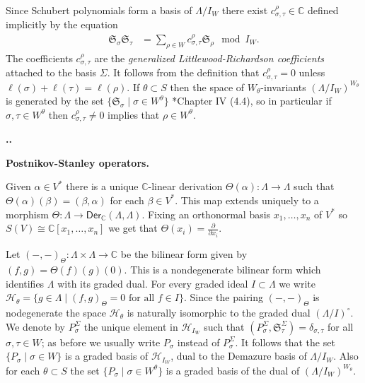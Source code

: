 \documentclass[11pt,fleqn]{amsart}
\renewcommand\thesection{\arabic{section}}
\newcounter{para}[section]
\renewcommand\thepara{\thesection.\arabic{para}}
\def\paragraph{%
 \noindent
 \refstepcounter{para}%
 \textbf{\thepara.}\hspace{1ex}%
}
\newcommand\about[1]{%
 {\bfseries#1.}%
}
\newcommand\CC{\mathbb C}
\renewcommand\to{\longrightarrow}
\renewcommand\SS{\mathfrak S}
\begin{document}
Since Schubert polynomials form a basis of $\Lambda / I_W$ there exist 
$c_{\sigma, \tau}^\rho \in \CC$ defined implicitly by the equation
\begin{align*}
\SS_\sigma \SS_\tau 
	&= \sum_{\rho \in W} c^\rho_{\sigma, \tau} \SS_\rho \mod I_W.
\end{align*}
The coefficients $c_{\sigma, \tau}^\rho$ are the \emph{generalized 
Littlewood-Richardson coefficients} attached to the basis $\Sigma$. It follows 
from the definition that $c^\rho_{\sigma, \tau} = 0$ unless $\ell(\sigma) + 
\ell(\tau) = \ell(\rho)$. If $\theta \subset S$ then the space of 
$W_\theta$-invariants $(\Lambda/I_W)^{W_\theta}$ is generated by the set 
$\{\SS_\sigma \mid \sigma \in W^\theta\}$ 
\cite{Hiller-coxeter-book}*{Chapter IV (4.4)}, so in particular if $\sigma, 
\tau \in W^\theta$ then $c^{\rho}_{\sigma, \tau} \neq 0$ implies that 
$\rho \in W^\theta$. 

\paragraph
\about{Postnikov-Stanley operators}
\label{ps-operators}
Given $\alpha \in V^*$ there is a unique $\CC$-linear derivation 
$\Theta(\alpha): \Lambda \to \Lambda$ such that $\Theta(\alpha)(\beta) = 
(\beta, \alpha)$ for each $\beta \in V^*$. This map extends uniquely to a 
morphism $\Theta: \Lambda \to \mathsf{Der}_\CC(\Lambda, \Lambda)$. Fixing an 
orthonormal basis $x_1, \ldots, x_n$ of $V^*$ so $S(V) \cong \CC[x_1, \ldots, 
x_n]$ we get that $\Theta(x_i) = \frac{\partial}{\partial x_i}$.

Let $(-,-)_\Theta: \Lambda \times \Lambda \to \CC$ be the bilinear form given 
by $(f,g) = \Theta(f)(g)(0)$. This is a nondegenerate bilinear form which 
identifies $\Lambda$ with its graded dual. For every graded ideal $I \subset 
\Lambda$ we write $\mathcal H_\theta = \{g \in \Lambda \mid (f,g)_\Theta = 0 
\mbox{ for all } f \in I\}$. Since the pairing $(-,-)_\Theta$ is nodegenerate 
the space $\mathcal H_\theta$ is naturally isomorphic to the graded dual 
$(\Lambda/I)^\circ$. We denote by $P_\sigma^\Sigma$ the unique element in 
$\mathcal H_{I_W}$ such that $(P_\sigma^\Sigma, \SS_{\tau}^\Sigma) = 
\delta_{\sigma, \tau}$ for all $\sigma, \tau \in W$; as before we usually 
write $P_\sigma$ instead of $P_\sigma^\Sigma$. It follows that the set 
$\{P_\sigma \mid \sigma \in W\}$ is a graded basis of $\mathcal H_{I_W}$, dual 
to the Demazure basis of $\Lambda/I_W$. Also for each $\theta \subset S$ the 
set $\{P_\sigma \mid \sigma \in W^\theta\}$ is a graded basis of the dual of 
$(\Lambda/I_W)^{W_\theta}$.
\end{document}
